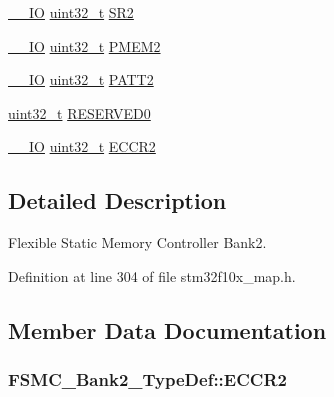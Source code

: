 \begin{DoxyCompactItemize}
\item 
\hyperlink{group___c_m_s_i_s___c_m3__core__definitions_gaec43007d9998a0a0e01faede4133d6be}{\+\_\+\+\_\+\+IO} \hyperlink{_p_e___types_8h_a33594304e786b158f3fb30289278f5af}{uint32\+\_\+t} \hyperlink{struct_f_s_m_c___bank2___type_def_a38ad7403e05c899dc266cf47f932cc8f}{S\+R2}
\item 
\hyperlink{group___c_m_s_i_s___c_m3__core__definitions_gaec43007d9998a0a0e01faede4133d6be}{\+\_\+\+\_\+\+IO} \hyperlink{_p_e___types_8h_a33594304e786b158f3fb30289278f5af}{uint32\+\_\+t} \hyperlink{struct_f_s_m_c___bank2___type_def_a29b2b75e74520e304e31c18cf9e4a7f8}{P\+M\+E\+M2}
\item 
\hyperlink{group___c_m_s_i_s___c_m3__core__definitions_gaec43007d9998a0a0e01faede4133d6be}{\+\_\+\+\_\+\+IO} \hyperlink{_p_e___types_8h_a33594304e786b158f3fb30289278f5af}{uint32\+\_\+t} \hyperlink{struct_f_s_m_c___bank2___type_def_a9b2c273e4b84f24efbd731bd4ba76a84}{P\+A\+T\+T2}
\item 
\hyperlink{_p_e___types_8h_a33594304e786b158f3fb30289278f5af}{uint32\+\_\+t} \hyperlink{struct_f_s_m_c___bank2___type_def_ac0433330a92f2bd04812384f63bb4a52}{R\+E\+S\+E\+R\+V\+E\+D0}
\item 
\hyperlink{group___c_m_s_i_s___c_m3__core__definitions_gaec43007d9998a0a0e01faede4133d6be}{\+\_\+\+\_\+\+IO} \hyperlink{_p_e___types_8h_a33594304e786b158f3fb30289278f5af}{uint32\+\_\+t} \hyperlink{struct_f_s_m_c___bank2___type_def_afebea17b3ac79d86ad59ce299ab5dd83}{E\+C\+C\+R2}
\end{DoxyCompactItemize}


\subsection{Detailed Description}
Flexible Static Memory Controller Bank2. 

Definition at line 304 of file stm32f10x\+\_\+map.\+h.



\subsection{Member Data Documentation}
\subsubsection[{\texorpdfstring{E\+C\+C\+R2}{ECCR2}}]{ F\+S\+M\+C\+\_\+\+Bank2\+\_\+\+Type\+Def\+::\+E\+C\+C\+R2}\hypertarget{struct_f_s_m_c___bank2___type_def_a1358cc808bc266e71043dd345f7fea84}{}\label{struct_f_s_m_c___bank2___type_def_a1358cc808bc266e71043dd345f7fea84}



